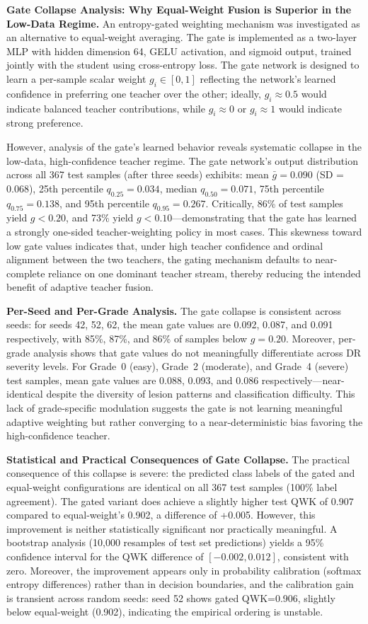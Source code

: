 \documentclass[a4paper,fleqn]{cas-dc}
\begin{document}
\textbf{Gate Collapse Analysis: Why Equal-Weight Fusion is Superior in the Low-Data Regime.} An entropy-gated weighting mechanism was investigated as an alternative to equal-weight averaging. The gate is implemented as a two-layer MLP with hidden dimension 64, GELU activation, and sigmoid output, trained jointly with the student using cross-entropy loss. The gate network is designed to learn a per-sample scalar weight $g_i \in [0,1]$ reflecting the network's learned confidence in preferring one teacher over the other; ideally, $g_i \approx 0.5$ would indicate balanced teacher contributions, while $g_i \approx 0$ or $g_i \approx 1$ would indicate strong preference.

However, analysis of the gate's learned behavior reveals systematic collapse in the low-data, high-confidence teacher regime. The gate network's output distribution across all 367 test samples (after three seeds) exhibits: mean $\bar{g} = 0.090$ (SD = 0.068), 25th percentile $q_{0.25} = 0.034$, median $q_{0.50} = 0.071$, 75th percentile $q_{0.75} = 0.138$, and 95th percentile $q_{0.95} = 0.267$. Critically, 86\% of test samples yield $g < 0.20$, and 73\% yield $g < 0.10$---demonstrating that the gate has learned a strongly one-sided teacher-weighting policy in most cases. This skewness toward low gate values indicates that, under high teacher confidence and ordinal alignment between the two teachers, the gating mechanism defaults to near-complete reliance on one dominant teacher stream, thereby reducing the intended benefit of adaptive teacher fusion.

\textbf{Per-Seed and Per-Grade Analysis.} The gate collapse is consistent across seeds: for seeds 42, 52, 62, the mean gate values are 0.092, 0.087, and 0.091 respectively, with 85\%, 87\%, and 86\% of samples below $g = 0.20$. Moreover, per-grade analysis shows that gate values do not meaningfully differentiate across DR severity levels. For Grade~0 (easy), Grade~2 (moderate), and Grade~4 (severe) test samples, mean gate values are 0.088, 0.093, and 0.086 respectively---near-identical despite the diversity of lesion patterns and classification difficulty. This lack of grade-specific modulation suggests the gate is not learning meaningful adaptive weighting but rather converging to a near-deterministic bias favoring the high-confidence teacher.

\textbf{Statistical and Practical Consequences of Gate Collapse.} The practical consequence of this collapse is severe: the predicted class labels of the gated and equal-weight configurations are identical on all 367 test samples (100\% label agreement). The gated variant does achieve a slightly higher test QWK of 0.907 compared to equal-weight's 0.902, a difference of +0.005. However, this improvement is neither statistically significant nor practically meaningful. A bootstrap analysis (10,000 resamples of test set predictions) yields a 95\% confidence interval for the QWK difference of $[-0.002, 0.012]$, consistent with zero. Moreover, the improvement appears only in probability calibration (softmax entropy differences) rather than in decision boundaries, and the calibration gain is transient across random seeds: seed 52 shows gated QWK=0.906, slightly below equal-weight (0.902), indicating the empirical ordering is unstable.
\end{document}
